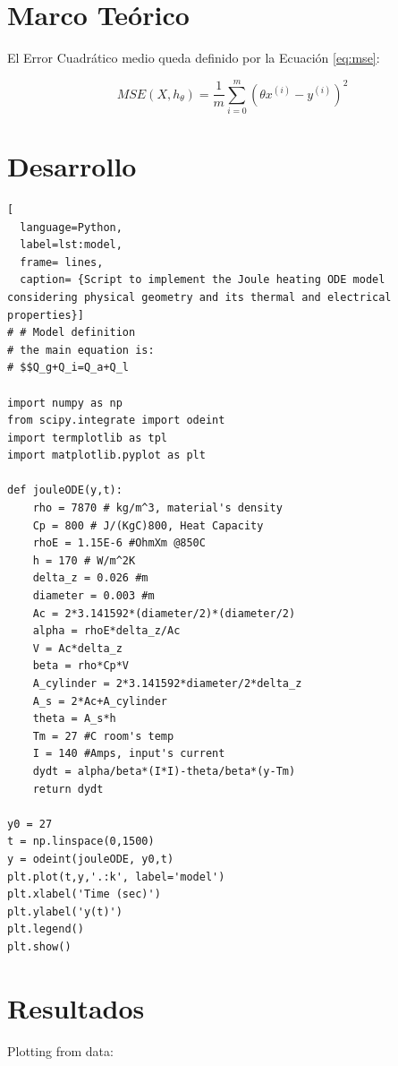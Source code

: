 \documentclass{article}
\begin{document}
\section{Marco Teórico}

\blindtext[2]

El Error Cuadrático medio queda definido por la Ecuación \eqref{eq:mse}:

\begin{equation}
	MSE(X,h_\theta)=\frac{1}{m}\sum_{i=0}^m\left(\theta x^{(i)}-y^{(i)} \right)^2 \label{eq:mse}
\end{equation}

\section{Desarrollo}

\blindtext[1]

\begin{lstlisting}[
  language=Python,
  label=lst:model,
  frame= lines,
  caption= {Script to implement the Joule heating ODE model considering physical geometry and its thermal and electrical properties}]
# # Model definition
# the main equation is:
# $$Q_g+Q_i=Q_a+Q_l

import numpy as np
from scipy.integrate import odeint
import termplotlib as tpl
import matplotlib.pyplot as plt

def jouleODE(y,t):
    rho = 7870 # kg/m^3, material's density
    Cp = 800 # J/(KgC)800, Heat Capacity
    rhoE = 1.15E-6 #OhmXm @850C
    h = 170 # W/m^2K
    delta_z = 0.026 #m
    diameter = 0.003 #m 
    Ac = 2*3.141592*(diameter/2)*(diameter/2)
    alpha = rhoE*delta_z/Ac
    V = Ac*delta_z
    beta = rho*Cp*V
    A_cylinder = 2*3.141592*diameter/2*delta_z
    A_s = 2*Ac+A_cylinder
    theta = A_s*h
    Tm = 27 #C room's temp
    I = 140 #Amps, input's current
    dydt = alpha/beta*(I*I)-theta/beta*(y-Tm)
    return dydt

y0 = 27
t = np.linspace(0,1500)
y = odeint(jouleODE, y0,t) 
plt.plot(t,y,'.:k', label='model')
plt.xlabel('Time (sec)')
plt.ylabel('y(t)')
plt.legend()
plt.show()
\end{lstlisting}



\section{Resultados}

\blindtext[1]

Plotting from data:
\end{document}
